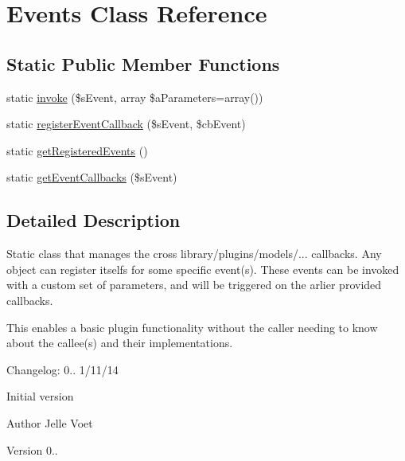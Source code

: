 \hypertarget{class_events}{\section{Events Class Reference}
\label{class_events}
}
\subsection*{Static Public Member Functions}
\begin{DoxyCompactItemize}
\item 
static \hyperlink{class_events_af95153d40cd1bb405134652b95a72c85}{invoke} (\$s\-Event, array \$a\-Parameters=array())
\item 
static \hyperlink{class_events_a313a70ddb786b9931b2c018439ed1078}{register\-Event\-Callback} (\$s\-Event, \$cb\-Event)
\item 
static \hyperlink{class_events_a02e936ec4fc72cb2b2c9a76368cf0792}{get\-Registered\-Events} ()
\item 
static \hyperlink{class_events_ab237ee5ebaf75e09600b7ca44df90e10}{get\-Event\-Callbacks} (\$s\-Event)
\end{DoxyCompactItemize}


\subsection{Detailed Description}
Static class that manages the cross library/plugins/models/... callbacks. Any object can register itselfs for some specific event(s). These events can be invoked with a custom set of parameters, and will be triggered on the arlier provided callbacks.

This enables a basic plugin functionality without the caller needing to know about the callee(s) and their implementations.

Changelog\-: 0.. 1/11/14
\begin{DoxyItemize}
\item Initial version
\end{DoxyItemize}

\begin{DoxyAuthor}{Author}
Jelle Voet 
\end{DoxyAuthor}
\begin{DoxyVersion}{Version}
0.. 
\end{DoxyVersion}


